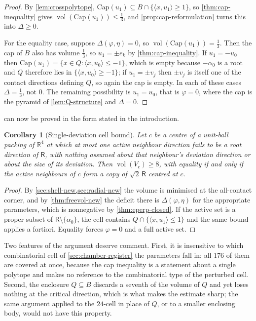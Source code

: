 \documentclass[11pt,reqno]{amsart}
\renewcommand{\_}{\origunderscore\allowbreak}
\numberwithin{equation}{section}
\theoremstyle{plain}
\newtheorem{cor}[thm]{Corollary}
\theoremstyle{definition}
\theoremstyle{remark}
\newcommand{\Rt}{\mathsf{R}}                 %
\newcommand{\tilt}{\varphi}                  %
\newcommand{\dev}{\eta}                      %
\newcommand{\defect}{\Delta}                 %
\newcommand{\base}{u}                        %
\newcommand{\capQ}{\mathrm{Cap}}             %
\DeclareMathOperator{\vol}{vol}
\begin{document}
\begin{proof}
By \cref{lem:crosspolytope}, $\capQ(\base_1)\subseteq
B\cap\{\langle x,\base_1\rangle\ge1\}$, so
\cref{thm:cap-inequality} gives $\vol(\capQ(\base_1))\le\tfrac13$, and
\cref{prop:cap-reformulation} turns this into $\defect\ge0$.

For the equality case, suppose $\defect(\tilt,\dev)=0$, so
$\vol(\capQ(\base_1))=\tfrac13$. Then the cap of $B$ also has volume
$\tfrac13$, so $\base_1=\pm e_k$ by \cref{thm:cap-inequality}. If
$\base_1=-\base_0$ then $\capQ(\base_1)=\{x\in Q:\langle
x,\base_0\rangle\le-1\}$, which is empty because $-\alpha_0$ is a root and
$Q$ therefore lies in $\{\langle x,\base_0\rangle\ge-1\}$; if
$\base_1=\pm v_j$ then $\pm v_j$ is itself one of the contact directions
defining $Q$, so again the cap is empty. In each of these cases
$\defect=\tfrac13$, not $0$. The remaining possibility is
$\base_1=\base_0$, that is $\tilt=0$, where the cap is the pyramid of
\cref{lem:Q-structure} and $\defect=0$.
\end{proof}

 can now be proved in the form stated in the
introduction.

\begin{cor}[Single-deviation cell bound]\label{cor:single-dev-uncond}
Let $c$ be a centre of a unit-ball packing of $\mathbb{R}^4$ at which at
most one active neighbour direction fails to be a root direction of $\Rt$,
with nothing assumed about that neighbour's deviation direction or about
the size of its deviation. Then $\vol(V_c)\ge8$, with equality if and only
if the active neighbours of $c$ form a copy of $\sqrt2\,\Rt$ centred at
$c$.
\end{cor}

\begin{proof}
By \cref{sec:shell-new,sec:radial-new} the volume is minimised at the
all-contact corner, and by \cref{thm:freevol-new} the deficit there is
$\defect(\tilt,\dev)$ for the appropriate parameters, which is
nonnegative by \cref{thm:eperp-closed}. If the active set is a proper
subset of $\Rt\setminus\{\alpha_0\}$, the cell contains
$Q\cap\{\langle x,\base_1\rangle\le1\}$ and the same bound applies a
fortiori. Equality forces $\tilt=0$ and a full active set.
\end{proof}

Two features of the argument deserve comment. First, it is insensitive to
which combinatorial cell of \cref{sec:chamber-register} the parameters
fall in: all $176$ of them are covered at once, because the cap
inequality is a statement about a single polytope and makes no reference
to the combinatorial type of the perturbed cell. Second, the enclosure
$Q\subseteq B$ discards a seventh of the volume of $Q$ and yet loses
nothing at the critical direction, which is what makes the estimate
sharp; the same argument applied to the $24$-cell in place of $Q$, or to
a smaller enclosing body, would not have this property.
\end{document}
